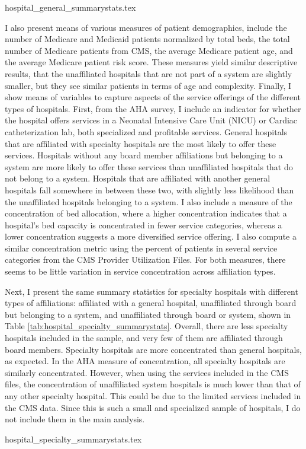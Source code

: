 \documentclass[12pt]{article}
\begin{document}
    {hospital_general_summarystats.tex}

    I also present means of various measures of patient demographics, include the number of Medicare and Medicaid patients normalized by total beds, the total number of Medicare patients from CMS, the average Medicare patient age, and the average Medicare patient risk score. These measures yield similar descriptive results, that the unaffiliated hospitals that are not part of a system are slightly smaller, but they see similar patients in terms of age and complexity. Finally, I show means of variables to capture aspects of the service offerings of the different types of hospitals. First, from the AHA survey, I include an indicator for whether the hospital offers services in a Neonatal Intensive Care Unit (NICU) or Cardiac catheterization lab, both specialized and profitable services. General hospitals that are affiliated with specialty hospitals are the most likely to offer these services. Hospitals without any board member affiliations but belonging to a system are more likely to offer these services than unaffiliated hospitals that do not belong to a system. Hospitals that are affiliated with another general hospitals fall somewhere in between these two, with slightly less likelihood than the unaffiliated hospitals belonging to a system. I also include a measure of the concentration of bed allocation, where a higher concentration indicates that a hospital's bed capacity is concentrated in fewer service categories, whereas a lower concentration suggests a more diversified service offering. I also compute a similar concentration metric using the percent of patients in several service categories from the CMS Provider Utilization Files. For both measures, there seems to be little variation in service concentration across affiliation types.

    Next, I present the same summary statistics for specialty hospitals with different types of affiliations: affiliated with a general hospital, unaffiliated through board but belonging to a system, and unaffiliated through board or system, shown in Table \ref{tab:hospital_specialty_summarystats}. Overall, there are less specialty hospitals included in the sample, and very few of them are affiliated through board members. Specialty hospitals are more concentrated than general hospitals, as expected. In the AHA measure of concentration, all specialty hospitals are similarly concentrated. However, when using the services included in the CMS files, the concentration of unaffiliated system hospitals is much lower than that of any other specialty hospital. This could be due to the limited services included in the CMS data. Since this is such a small and specialized sample of hospitals, I do not include them in the main analysis. 

    {hospital_specialty_summarystats.tex}
    
    


  

    \newpage


    \printbibliography


    

    

    

    

    

	
	
	
\end{document}
